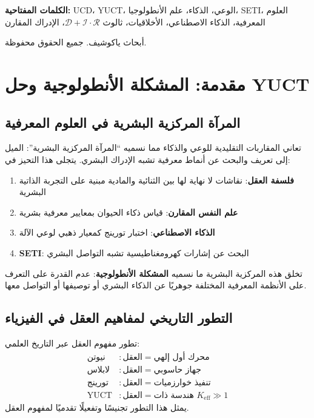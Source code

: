 \documentclass[12pt,a4paper]{article}
\newcommand{\eff}{\mathrm{eff}}
\newcommand{\Ke}{K_{\eff}}
\begin{document}
\begin{titlepage}
\begin{center}
			\vspace{0cm}
			
			\noindent
			\small\textbf{الكلمات المفتاحية:} UCD، YUCT، الوعي، الذكاء، علم الأنطولوجيا، SETI، العلوم المعرفية، الذكاء الاصطناعي، الأخلاقيات، ثالوث \(\mathcal{D}+\mathcal{I}\cdot\mathcal{R}\)، الإدراك المقارن
			
			\vspace{0.5cm}
			
			\noindent
			 أبحاث ياكوشيف. جميع الحقوق محفوظة.
		\end{center}
	\end{titlepage}
	
	\tableofcontents
	
	\newpage
	
	\section{مقدمة: المشكلة الأنطولوجية وحل YUCT}
	
	\subsection{المرآة المركزية البشرية في العلوم المعرفية}
	
	تعاني المقاربات التقليدية للوعي والذكاء مما نسميه ``المرآة المركزية البشرية'': الميل إلى تعريف والبحث عن أنماط معرفية تشبه الإدراك البشري. يتجلى هذا التحيز في:
	\begin{enumerate}
		\item \textbf{فلسفة العقل}: نقاشات لا نهاية لها بين الثنائية والمادية مبنية على التجربة الذاتية البشرية
		\item \textbf{علم النفس المقارن}: قياس ذكاء الحيوان بمعايير معرفية بشرية
		\item \textbf{الذكاء الاصطناعي}: اختبار تورينج كمعيار ذهبي لوعي الآلة
		\item \textbf{SETI}: البحث عن إشارات كهرومغناطيسية تشبه التواصل البشري
	\end{enumerate}
	تخلق هذه المركزية البشرية ما نسميه \textbf{المشكلة الأنطولوجية}: عدم القدرة على التعرف على الأنظمة المعرفية المختلفة جوهريًا عن الذكاء البشري أو توصيفها أو التواصل معها.
	
	\subsection{التطور التاريخي لمفاهيم العقل في الفيزياء}
	
	تطور مفهوم العقل عبر التاريخ العلمي:
	\[
	\begin{aligned}
		\text{نيوتن} &: \text{العقل} = \text{محرك أول إلهي} \\
		\text{لابلاس} &: \text{العقل} = \text{جهاز حاسوبي} \\
		\text{تورينج} &: \text{العقل} = \text{تنفيذ خوارزميات} \\
		\text{YUCT} &: \text{العقل} = \text{هندسة ذات } \Ke \gg 1
	\end{aligned}
	\]
	يمثل هذا التطور تجنيسًا وتفعيلًا تقدميًا لمفهوم العقل.
	
\end{document}

